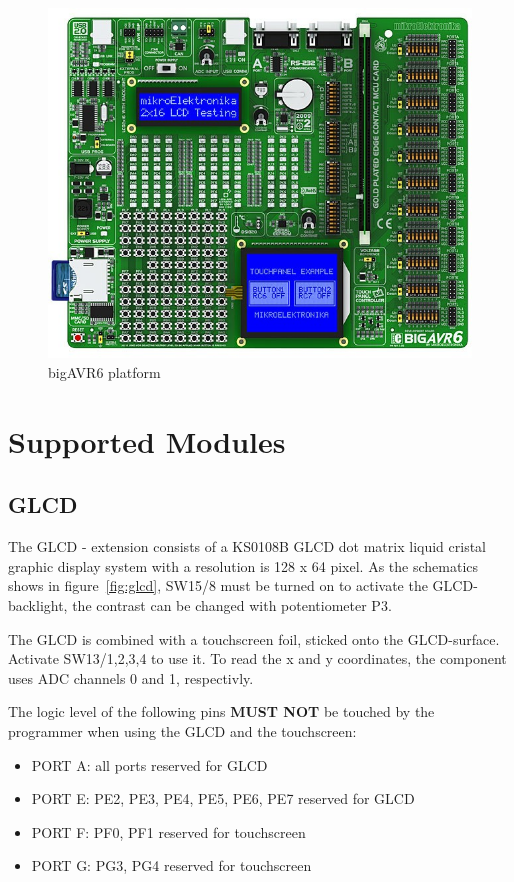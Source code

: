 \begin{figure}[h]
 \centerline{\includegraphics[width=.5\columnwidth]{pics/bigavr6.png}}
  \caption{bigAVR6 platform}
  \label{fig:bigavr6}
\end{figure}





\section{Supported Modules}

\subsection{GLCD}

The GLCD - extension consists of a KS0108B GLCD dot matrix liquid cristal graphic display system with a resolution is 128 x 64 pixel. As the schematics shows in figure~\ref{fig:glcd}, SW15/8 must be turned on to activate the GLCD-backlight, the contrast can be changed with potentiometer P3.

The GLCD is combined with a touchscreen foil, sticked onto the GLCD-surface. Activate SW13/1,2,3,4 to use it. To read the x and y coordinates, the component uses ADC channels 0 and 1, respectivly. 

The logic level of the following pins \textbf{MUST NOT} be touched by the programmer when using the GLCD and the touchscreen:

\begin{itemize}
 \item PORT A: 					all ports reserved for GLCD
 \item PORT E: PE2, PE3, PE4, PE5, PE6, PE7	reserved for GLCD
 \item PORT F: PF0, PF1 			reserved for touchscreen
 \item PORT G: PG3, PG4				reserved for touchscreen
\end{itemize}


